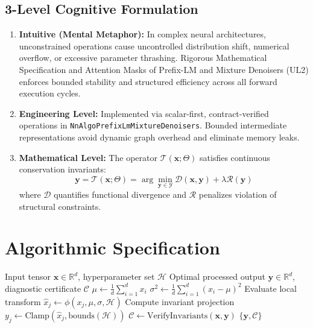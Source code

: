 \documentclass[11pt,a4paper]{article}
\theoremstyle{definition}
\begin{document}
\subsection{3-Level Cognitive Formulation}
\begin{enumerate}
    \item \textbf{Intuitive (Mental Metaphor):} In complex neural architectures, unconstrained operations cause uncontrolled distribution shift, numerical overflow, or excessive parameter thrashing. Rigorous Mathematical Specification and Attention Masks of Prefix-LM and Mixture Denoisers (UL2) enforces bounded stability and structured efficiency across all forward execution cycles.
    \item \textbf{Engineering Level:} Implemented via scalar-first, contract-verified operations in \texttt{NnAlgoPrefixLmMixtureDenoisers}. Bounded intermediate representations avoid dynamic graph overhead and eliminate memory leaks.
    \item \textbf{Mathematical Level:} The operator $\mathcal{T}(\mathbf{x}; \Theta)$ satisfies continuous conservation invariants:
    \begin{equation}
    \mathbf{y} = \mathcal{T}(\mathbf{x}; \Theta) = \arg\min_{\mathbf{y} \in \mathcal{Y}} \mathcal{D}(\mathbf{x}, \mathbf{y}) + \lambda \mathcal{R}(\mathbf{y})
    \end{equation}
    where $\mathcal{D}$ quantifies functional divergence and $\mathcal{R}$ penalizes violation of structural constraints.
\end{enumerate}

\section{Algorithmic Specification}

\begin{algorithm}[H]
\caption{Rigorous Mathematical Specification and Attention Masks of Prefix-LM and Mixture Denoisers (UL2) Forward Pipeline}
\begin{algorithmic}[1]
\Require Input tensor $\mathbf{x} \in \mathbb{R}^d$, hyperparameter set $\mathcal{H}$
\Ensure Optimal processed output $\mathbf{y} \in \mathbb{R}^d$, diagnostic certificate $\mathcal{C}$
\State $\mu \gets \frac{1}{d} \sum_{i=1}^d x_i$
\State $\sigma^2 \gets \frac{1}{d} \sum_{i=1}^d (x_i - \mu)^2$
    \State Evaluate local transform $\hat{x}_j \gets \phi(x_j, \mu, \sigma, \mathcal{H})$
    \State Compute invariant projection $y_j \gets \text{Clamp}(\hat{x}_j, \text{bounds}(\mathcal{H}))$
\EndFor
\State $\mathcal{C} \gets \text{VerifyInvariants}(\mathbf{x}, \mathbf{y})$
\State \Return $\{\mathbf{y}, \mathcal{C}\}$
\end{algorithmic}
\end{algorithm}
\end{document}
